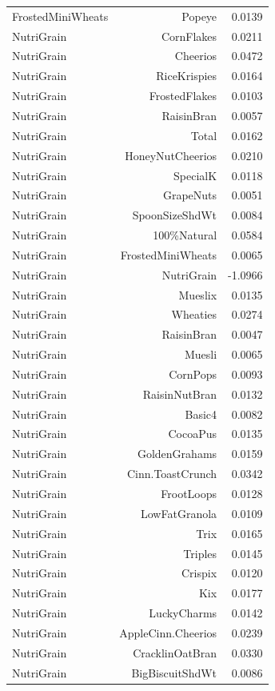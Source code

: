\begin{longtable}{@{}lrr@{}}
FrostedMiniWheats & Popeye & 0.0139 \\
NutriGrain & CornFlakes & 0.0211 \\
NutriGrain & Cheerios & 0.0472 \\
NutriGrain & RiceKrispies & 0.0164 \\
NutriGrain & FrostedFlakes & 0.0103 \\
NutriGrain & RaisinBran & 0.0057 \\
NutriGrain & Total & 0.0162 \\
NutriGrain & HoneyNutCheerios & 0.0210 \\
NutriGrain & SpecialK & 0.0118 \\
NutriGrain & GrapeNuts & 0.0051 \\
NutriGrain & SpoonSizeShdWt & 0.0084 \\
NutriGrain & 100\%Natural & 0.0584 \\
NutriGrain & FrostedMiniWheats & 0.0065 \\
NutriGrain & NutriGrain & -1.0966 \\
NutriGrain & Mueslix & 0.0135 \\
NutriGrain & Wheaties & 0.0274 \\
NutriGrain & RaisinBran & 0.0047 \\
NutriGrain & Muesli & 0.0065 \\
NutriGrain & CornPops & 0.0093 \\
NutriGrain & RaisinNutBran & 0.0132 \\
NutriGrain & Basic4 & 0.0082 \\
NutriGrain & CocoaPus & 0.0135 \\
NutriGrain & GoldenGrahams & 0.0159 \\
NutriGrain & Cinn.ToastCrunch & 0.0342 \\
NutriGrain & FrootLoops & 0.0128 \\
NutriGrain & LowFatGranola & 0.0109 \\
NutriGrain & Trix & 0.0165 \\
NutriGrain & Triples & 0.0145 \\
NutriGrain & Crispix & 0.0120 \\
NutriGrain & Kix & 0.0177 \\
NutriGrain & LuckyCharms & 0.0142 \\
NutriGrain & AppleCinn.Cheerios & 0.0239 \\
NutriGrain & CracklinOatBran & 0.0330 \\
NutriGrain & BigBiscuitShdWt & 0.0086 \\

\end{longtable}
